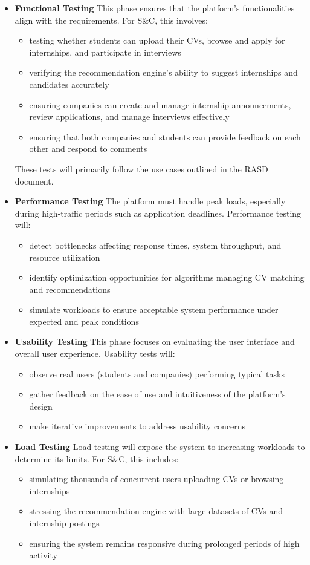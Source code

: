 \begin{itemize}
\item \textbf{Functional Testing}
This phase ensures that the platform's functionalities align with the requirements. For S\&C, this involves:
\begin{itemize}
    \item testing whether students can upload their CVs, browse and apply for internships, and participate in interviews
    \item verifying the recommendation engine’s ability to suggest internships and candidates accurately
    \item ensuring companies can create and manage internship announcements, review applications, and manage interviews effectively
    \item ensuring that both companies and students can provide feedback on each other and respond to comments
\end{itemize}
These tests will primarily follow the use cases outlined in the RASD document.

\item \textbf{Performance Testing}
The platform must handle peak loads, especially during high-traffic periods such as application deadlines. Performance testing will:
\begin{itemize}
    \item detect bottlenecks affecting response times, system throughput, and resource utilization
    \item identify optimization opportunities for algorithms managing CV matching and recommendations
    \item simulate workloads to ensure acceptable system performance under expected and peak conditions
\end{itemize}

\item \textbf{Usability Testing}
This phase focuses on evaluating the user interface and overall user experience. Usability tests will:
\begin{itemize}
    \item observe real users (students and companies) performing typical tasks
    \item gather feedback on the ease of use and intuitiveness of the platform's design
    \item make iterative improvements to address usability concerns
\end{itemize}

\item \textbf{Load Testing}
Load testing will expose the system to increasing workloads to determine its limits. For S\&C, this includes:
\begin{itemize}
    \item simulating thousands of concurrent users uploading CVs or browsing internships
    \item stressing the recommendation engine with large datasets of CVs and internship postings
    \item ensuring the system remains responsive during prolonged periods of high activity
\end{itemize}


\end{itemize}

